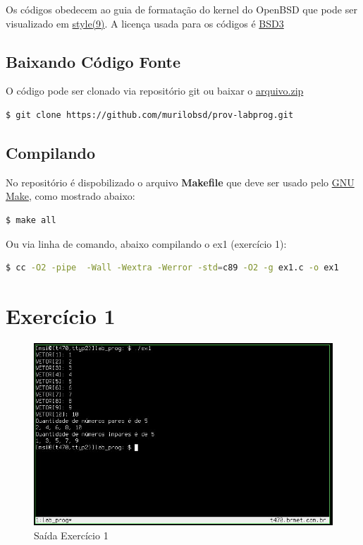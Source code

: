 \documentclass[12pt,a4paper]{article}
\let\oldsection\section
\renewcommand\section{\clearpage\oldsection}
\begin{document}
Os códigos obedecem ao guia de formatação do kernel do OpenBSD que pode ser 
visualizado em \href{https://man.openbsd.org/style}{style(9)}. A licença usada
para os códigos é \href{https://opensource.org/licenses/BSD-3-Clause}{BSD3}

\subsection{Baixando Código Fonte}
\noindent O código pode ser clonado via repositório git ou baixar o
\href{https://github.com/murilobsd/prov-labprog/archive/master.zip}{arquivo.zip}

\begin{lstlisting}[language=bash]
  $ git clone https://github.com/murilobsd/prov-labprog.git
\end{lstlisting}

\subsection{Compilando}
\noindent No repositório é dispobilizado o arquivo \textbf{Makefile} que deve
ser usado pelo \href{https://www.gnu.org/software/make/}{GNU Make}, como
mostrado abaixo:
\begin{lstlisting}[language=bash]
  $ make all
\end{lstlisting}

\noindent Ou via linha de comando, abaixo compilando o ex1 (exercício 1):
\begin{lstlisting}[language=bash]
  $ cc -O2 -pipe  -Wall -Wextra -Werror -std=c89 -O2 -g ex1.c -o ex1
\end{lstlisting}

\pagebreak

\section{Exercício 1}

\begin{figure}[htb!]
	\centering
	\includegraphics[width=16cm]{ex1}
	\caption{Saída Exercício 1}
	\label{fig:1}
\end{figure}
\end{document}

